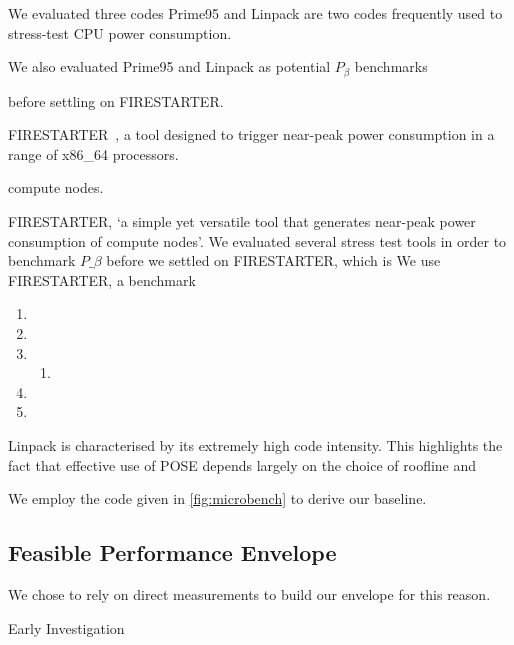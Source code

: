 We evaluated three codes
Prime95 and Linpack are two codes frequently used to stress-test CPU power consumption.

We also evaluated Prime95 and Linpack as potential $P_{\beta}$ benchmarks


before settling on FIRESTARTER.

FIRESTARTER~\cite{hackenberg:2013ab}, a tool designed to trigger near-peak power consumption in a range of x86\_64 processors.

compute nodes.

FIRESTARTER, `a simple yet versatile tool that generates near-peak power consumption of compute nodes'.
We evaluated several stress test tools in order to benchmark $P\_{\beta}$ before we settled on
FIRESTARTER, which is 
We use FIRESTARTER, a benchmark

\begin{enumerate}
  \item {}
  \item {}
  \item {}
  \begin{enumerate}
    \item {}
  \end{enumerate}
  \item {}
  \item {}
\end{enumerate}



Linpack is characterised by its extremely high code intensity. 
This highlights the fact that effective use of POSE depends largely on the choice of roofline and 





We employ the code given in \autoref{fig:microbench} to derive our baseline.  

\subsection{Feasible Performance Envelope}

We chose to rely on direct measurements to build our envelope for this reason.


\begin{table}
\centering
\caption{Early Investigation}

\end{table} 



